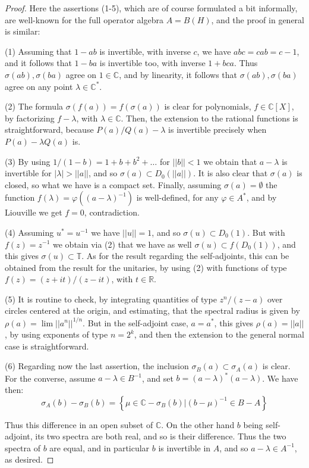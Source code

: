 \documentclass[12pt]{amsbook}
\begin{document}
\begin{proof}
Here the assertions (1-5), which are of course formulated a bit informally, are well-known for the full operator algebra $A=B(H)$, and the proof in general is similar:

\medskip

(1) Assuming that $1-ab$ is invertible, with inverse $c$, we have $abc=cab=c-1$, and it follows that $1-ba$ is invertible too, with inverse $1+bca$. Thus $\sigma(ab),\sigma(ba)$ agree on $1\in\mathbb C$, and by linearity, it follows that $\sigma(ab),\sigma(ba)$ agree on any point $\lambda\in\mathbb C^*$.

\medskip

(2) The formula $\sigma(f(a))=f(\sigma(a))$ is clear for polynomials, $f\in\mathbb C[X]$, by factorizing $f-\lambda$, with $\lambda\in\mathbb C$. Then, the extension to the rational functions is straightforward, because $P(a)/Q(a)-\lambda$ is invertible precisely when $P(a)-\lambda Q(a)$ is.

\medskip

(3) By using $1/(1-b)=1+b+b^2+\ldots$ for $||b||<1$ we obtain that $a-\lambda$ is invertible for $|\lambda|>||a||$, and so $\sigma(a)\subset D_0(||a||)$. It is also clear that $\sigma(a)$ is closed, so what we have is a compact set. Finally, assuming $\sigma(a)=\emptyset$ the function $f(\lambda)=\varphi((a-\lambda)^{-1})$ is well-defined, for any $\varphi\in A^*$, and by Liouville we get $f=0$, contradiction.

\medskip

(4) Assuming $u^*=u^{-1}$ we have $||u||=1$, and so $\sigma(u)\subset D_0(1)$. But with $f(z)=z^{-1}$ we obtain via (2) that we have as well $\sigma(u)\subset f(D_0(1))$, and this gives $\sigma(u)\subset\mathbb T$. As for the result regarding the self-adjoints, this can be obtained from the result for the unitaries, by using (2) with functions of type $f(z)=(z+it)/(z-it)$, with $t\in\mathbb R$.

\medskip

(5) It is routine to check, by integrating quantities of type $z^n/(z-a)$ over circles centered at the origin, and estimating, that the spectral radius is given by $\rho(a)=\lim||a^n||^{1/n}$. But in the self-adjoint case, $a=a^*$, this gives $\rho(a)=||a||$, by using exponents of type $n=2^k$, and then the extension to the general normal case is straightforward.

\medskip 

(6) Regarding now the last assertion, the inclusion $\sigma_B(a)\subset\sigma_A(a)$ is clear. For the converse, assume $a-\lambda\in B^{-1}$, and set $b=(a-\lambda )^*(a-\lambda )$. We have then:
$$\sigma_A(b)-\sigma_B(b)=\left\{\mu\in\mathbb C-\sigma_B(b)\Big|(b-\mu)^{-1}\in B-A\right\}$$

Thus this difference in an open subset of $\mathbb C$. On the other hand $b$ being self-adjoint, its two spectra are both real, and so is their difference. Thus the two spectra of $b$ are equal, and in particular $b$ is invertible in $A$, and so $a-\lambda\in A^{-1}$, as desired.
\end{proof}
\end{document}

